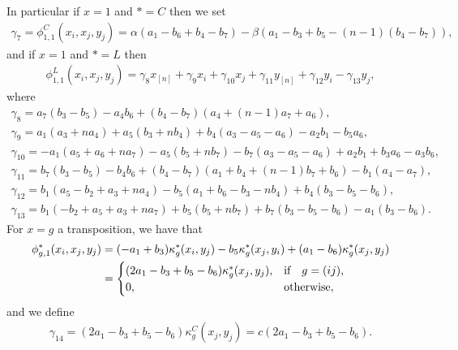 \documentclass[pdftex]{sigma}
\numberwithin{equation}{section}
\begin{document}
In particular if $x=1$ and $*=C$ then we set
\begin{gather*}
\gamma_7=\phi_{1,1}^C(x_i,x_j,y_j)=\alpha(a_1-b_6+b_4-b_7)-\beta(a_1-b_3+b_5-(n-1)(b_4-b_7)),
\end{gather*}
and if $x=1$ and $*=L$ then
\begin{gather*}
\phi_{1,1}^L(x_i,x_j,y_j)
=\gamma_8 x_{[n]} +\gamma_9 x_i +\gamma_{10} x_j +\gamma_{11} y_{[n]} +\gamma_{12} y_i -\gamma_{13}y_j,
\end{gather*}
where
\begin{gather*}
\gamma_8=a_7(b_3 - b_5) - a_4 b_6 + (b_4-b_7)(a_4 + (n-1)a_7 + a_6), \\
\gamma_9=a_1(a_3 + na_4) + a_5(b_3 + nb_4) + b_4(a_3 - a_5 - a_6) - a_2 b_1 - b_5 a_6, \\
\gamma_{10}=-a_1(a_5 + a_6 + na_7) - a_5(b_5 + nb_7) - b_7(a_3 - a_5 - a_6) + a_2 b_1 + b_3 a_6 - a_3 b_6, \\
\gamma_{11}=b_7(b_3 - b_5) - b_4 b_6 + (b_4 - b_7)(a_1 + b_4 + (n-1) b_7 + b_6) - b_1(a_4 - a_7), \\
\gamma_{12}=b_1(a_5 - b_2 + a_3 + na_4) - b_5(a_1 + b_6 - b_3 - nb_4) + b_4(b_3 - b_5 - b_6),
\\
\gamma_{13}=b_1(-b_2 + a_5 + a_3 + na_7) + b_5(b_5 + nb_7) + b_7(b_3 - b_5 - b_6) - a_1(b_3 - b_6).
\end{gather*}
For $x=g$ a transposition, we have that
\begin{align*}
\phi_{g,1}^*(x_i,x_j,y_j)&=(-a_1 + b_3)\kappa^*_g(x_i,y_j) - b_5\kappa^*_g(x_j,y_i) + (a_1 - b_6)\kappa^*_g(x_j,y_j)
\\
&=\begin{cases}
 (2a_1 - b_3 + b_5 - b_6)\kappa^*_g(x_j,y_j), & \text{if\quad $g=(ij)$,} \\
 0, & \text{otherwise},
\end{cases}
\end{align*}
and we define
\begin{gather*}
\gamma_{14}=(2a_1 - b_3 + b_5 - b_6)\kappa^C_g(x_j,y_j)=c(2a_1 - b_3 + b_5 - b_6).
\end{gather*}
\end{document}

